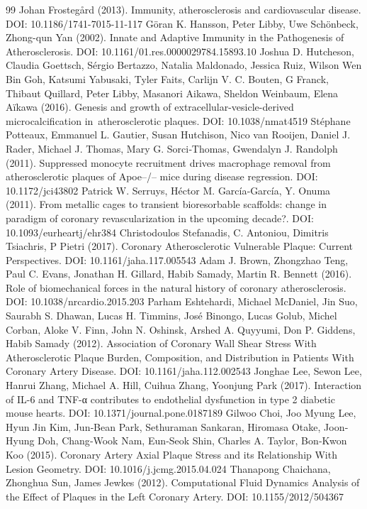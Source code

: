 \documentclass[preprint,12pt]{elsarticle}
\begin{document}
\begin{thebibliography}{99}
 Johan Frostegård (2013). Immunity, atherosclerosis and cardiovascular disease. DOI: 10.1186/1741-7015-11-117
 Göran K. Hansson, Peter Libby, Uwe Schönbeck, Zhong-qun Yan (2002). Innate and Adaptive Immunity in the Pathogenesis of Atherosclerosis. DOI: 10.1161/01.res.0000029784.15893.10
 Joshua D. Hutcheson, Claudia Goettsch, Sérgio Bertazzo, Natalia Maldonado, Jessica Ruiz, Wilson Wen Bin Goh, Katsumi Yabusaki, Tyler Faits, Carlijn V. C. Bouten, G Franck, Thibaut Quillard, Peter Libby, Masanori Aikawa, Sheldon Weinbaum, Elena Aïkawa (2016). Genesis and growth of extracellular-vesicle-derived microcalcification in atherosclerotic plaques. DOI: 10.1038/nmat4519
 Stéphane Potteaux, Emmanuel L. Gautier, Susan Hutchison, Nico van Rooijen, Daniel J. Rader, Michael J. Thomas, Mary G. Sorci‐Thomas, Gwendalyn J. Randolph (2011). Suppressed monocyte recruitment drives macrophage removal from atherosclerotic plaques of Apoe–/– mice during disease regression. DOI: 10.1172/jci43802
 Patrick W. Serruys, Héctor M. García‐García, Y. Onuma (2011). From metallic cages to transient bioresorbable scaffolds: change in paradigm of coronary revascularization in the upcoming decade?. DOI: 10.1093/eurheartj/ehr384
 Christodoulos Stefanadis, C. Antoniou, Dimitris Tsiachris, P Pietri (2017). Coronary Atherosclerotic Vulnerable Plaque: Current Perspectives. DOI: 10.1161/jaha.117.005543
 Adam J. Brown, Zhongzhao Teng, Paul C. Evans, Jonathan H. Gillard, Habib Samady, Martin R. Bennett (2016). Role of biomechanical forces in the natural history of coronary atherosclerosis. DOI: 10.1038/nrcardio.2015.203
 Parham Eshtehardi, Michael McDaniel, Jin Suo, Saurabh S. Dhawan, Lucas H. Timmins, José Binongo, Lucas Golub, Michel Corban, Aloke V. Finn, John N. Oshinsk, Arshed A. Quyyumi, Don P. Giddens, Habib Samady (2012). Association of Coronary Wall Shear Stress With Atherosclerotic Plaque Burden, Composition, and Distribution in Patients With Coronary Artery Disease. DOI: 10.1161/jaha.112.002543
 Jonghae Lee, Sewon Lee, Hanrui Zhang, Michael A. Hill, Cuihua Zhang, Yoonjung Park (2017). Interaction of IL-6 and TNF-α contributes to endothelial dysfunction in type 2 diabetic mouse hearts. DOI: 10.1371/journal.pone.0187189
 Gilwoo Choi, Joo Myung Lee, Hyun Jin Kim, Jun‐Bean Park, Sethuraman Sankaran, Hiromasa Otake, Joon‐Hyung Doh, Chang‐Wook Nam, Eun‐Seok Shin, Charles A. Taylor, Bon‐Kwon Koo (2015). Coronary Artery Axial Plaque Stress and its Relationship With Lesion Geometry. DOI: 10.1016/j.jcmg.2015.04.024
 Thanapong Chaichana, Zhonghua Sun, James Jewkes (2012). Computational Fluid Dynamics Analysis of the Effect of Plaques in the Left Coronary Artery. DOI: 10.1155/2012/504367
\end{thebibliography}
\end{document}

